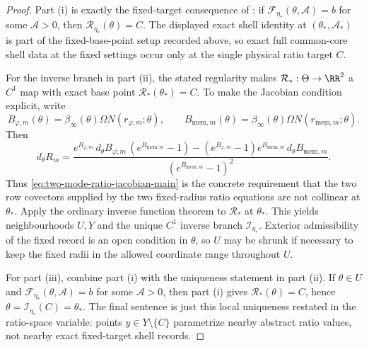\begin{proof}
Part (i) is exactly the fixed-target consequence of
: if
$\mathcal F_{\eta_*}(\theta,\mathcal A)=b$ for some $\mathcal A>0$, then
$\mathcal R_{\eta_*}(\theta)=C$. The displayed exact shell identity at
$(\theta_*,\mathcal A_*)$ is part of the fixed-base-point setup recorded above,
so exact full common-core shell data at the fixed settings occur only at the
single physical ratio target $C$.

For the inverse branch in part (ii), the stated regularity makes
$\mathcal R_*:\Theta\to\RR^2$ a $C^1$ map with exact base point
$\mathcal R_*(\theta_*)=C$. To make the Jacobian condition explicit, write
\[
B_{\varphi,m}(\theta)=\beta_\infty(\theta)\Omega N(r_{\varphi,m};\theta),
\qquad
B_{\mathrm{mem},m}(\theta)=\beta_\infty(\theta)\Omega N(r_{{\mathrm{mem}},m};\theta).
\]
Then
\[
d_\theta R_m=
\frac{
e^{B_{\varphi,m}}\,d_\theta B_{\varphi,m}\,(e^{B_{\mathrm{mem},m}}-1)
-(e^{B_{\varphi,m}}-1)e^{B_{\mathrm{mem},m}}\,d_\theta B_{\mathrm{mem},m}
}
{(e^{B_{\mathrm{mem},m}}-1)^2}.
\]
Thus \eqref{eq:two-mode-ratio-jacobian-main} is the concrete requirement that
the two row covectors supplied by the two fixed-radius ratio equations are not
collinear at $\theta_*$. Apply the ordinary inverse function theorem to
$\mathcal R_*$ at $\theta_*$. This yields neighbourhoods $U,Y$ and the unique
$C^1$ inverse branch $\mathcal I_{\eta_*}$. Exterior admissibility of the fixed
record is an open condition in $\theta$, so $U$ may be shrunk if necessary to
keep the fixed radii in the allowed coordinate range throughout $U$.

For part (iii), combine part (i) with the uniqueness statement in part (ii).
If $\theta\in U$ and $\mathcal F_{\eta_*}(\theta,\mathcal A)=b$ for some
$\mathcal A>0$, then part (i) gives $\mathcal R_*(\theta)=C$, hence
$\theta=\mathcal I_{\eta_*}(C)=\theta_*$. The final sentence is just this local
uniqueness restated in the ratio-space variable: points
$y\in Y\setminus\{C\}$ parametrize nearby abstract ratio values, not nearby
exact fixed-target shell records.
\end{proof}

